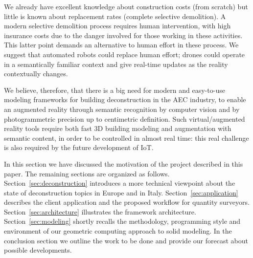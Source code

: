 We already have excellent knowledge about construction costs (from scratch) but little is known about replacement rates (complete selective demolition). A modern selective demolition process requires human intervention, with high insurance costs due to the danger involved for those working in these activities. This latter point demands an alternative to human effort in these process. We suggest that automated robots could replace human effort; drones could operate in a semantically familiar context and give real-time updates as the reality contextually changes. 

We believe, therefore, that there is a big need for modern and easy-to-use modeling frameworks for building deconstruction in the AEC industry, to enable an augmented reality through semantic recognition by computer vision and by photogrammetric precision up to centimetric definition. Such virtual/augmented reality tools require both fast 3D building modeling and augmentation with semantic content, in order to be controlled in almost real time: this real challenge is also required by the future development of IoT. 	  
 
In this section we have discussed the motivation of the project described in this paper. The remaining sections are organized as follows.
Section~\ref{sec:deconstruction} introduces a more technical viewpoint about the state of deconstruction topics in Europe and in Italy.
Section~\ref{sec:application} describes the client application and the proposed workflow for quantity surveyors.
Section~\ref{sec:architecture} illustrates the framework architecture. 
Section~\ref{sec:modeling} shortly recalls the methodology, programming style and environment of our geometric computing approach to solid modeling.
In the conclusion section we outline the work to be done and provide our forecast about possible developments.
